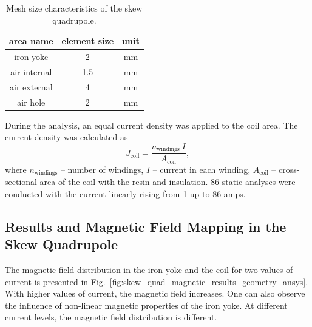 \begin{table}[H]
    \caption{Mesh size characteristics of the skew quadrupole.} 
    \vspace{-1.em} 
    \fontsize{10}{10}
    \selectfont 
    \renewcommand{\arraystretch}{1.5}
    \begin{center}
        \begin{tabular}{ ccc } 
        \hline
        area name & element size & unit \\
        \hline
        iron yoke & 2 & mm \\
        air internal & 1.5 & mm \\
        air external & 4 & mm \\
        air hole & 2 & mm \\
        \hline 
        \end{tabular}
    \end{center}  
     \label{table:mesh_characteristics_magnetic_ansys} 
\end{table}

During the analysis, an equal current density was applied to the coil area. The current density was calculated as
\begin{equation}
    J_\text{coil} = \frac{n_\text{windings}~I}{A_\text{coil}},
\end{equation}
where $n_\text{windings}$ -- number of windings, $I$ -- current in each winding, $A_\text{coil}$ -- cross-sectional area of the coil with the resin and insulation. 86 static analyses were conducted with the current linearly rising from 1 up to 86 amps. 

\subsection{Results and Magnetic Field Mapping in the Skew Quadrupole}

The magnetic field distribution in the iron yoke and the coil for two values of current is presented in Fig.~\ref{fig:skew_quad_magnetic_results_geometry_ansys}. With higher values of current, the magnetic field increases. One can also observe the influence of non-linear magnetic properties of the iron yoke. At different current levels, the magnetic field distribution is different.

